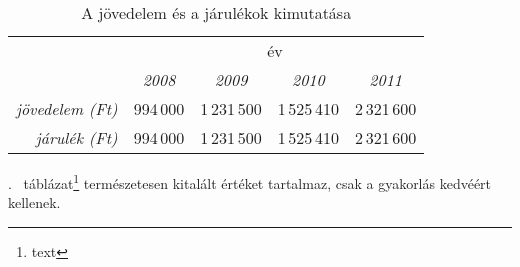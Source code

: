 \documentclass[a4paper,12pt]{article}
\begin{document}
	
	\begin{table}[ht!]
		\centering
	\begin{tabular}{|r|r|r|r|r|}
		\multicolumn{1}{c}{}&\multicolumn{4}{c}{év}\\
		\cline{2-5}
		\multicolumn{1}{c}{}&
		\multicolumn{1}{c}{\emph{2008}}&	
		\multicolumn{1}{c}{\emph{2009}}&
		\multicolumn{1}{c}{\emph{2010}}&
		\multicolumn{1}{c}{\emph{2011}}\\
		\hline
		\multicolumn{1}{|1|}{\emph{jövedelem (Ft)}}& 994\,000 & 1\,231\,500 & 1\,525\,410 & 2\,321\,600\\
		\multicolumn{1}{|1|}{\emph{járulék (Ft)}}& 994\,000 & 1\,231\,500 & 1\,525\,410 & 2\,321\,600\\
		\hline
	\end{tabular}
	\caption{A jövedelem és a járulékok kimutatása}
	\label{tablazat-jovedelem}
	\end{table}
	\Az{\ref{tablazat-jovedelem}}. ~táblázat\footnote{text} természetesen kitalált értéket tartalmaz, csak a gyakorlás kedvéért kellenek.
	
	
\end{document}
